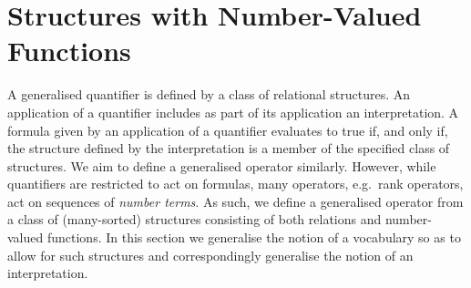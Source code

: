 \documentclass[../main/thesis.tex]{subfiles}
\begin{document}






% 
% 

\section{Structures with Number-Valued Functions}
\label{chpt:gen-op--sec:num-valued-vocab}

A generalised quantifier is defined by a class of relational structures. An
application of a quantifier includes as part of its application an
interpretation. A formula given by an application of a quantifier evaluates to
true if, and only if, the structure defined by the interpretation is a member of
the specified class of structures. We aim to define a generalised operator
similarly. However, while quantifiers are restricted to act on formulas, many
operators, e.g.\ rank operators, act on sequences of \emph{number terms}. As
such, we define a generalised operator from a class of (many-sorted) structures
consisting of both relations and number-valued functions. In this section we
generalise the notion of a vocabulary so as to allow for such structures and
correspondingly generalise the notion of an interpretation.
\end{document}
